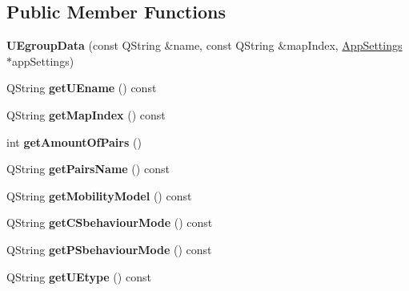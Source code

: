 \subsection*{Public Member Functions}
\begin{DoxyCompactItemize}
\item 
{\bfseries U\+Egroup\+Data} (const Q\+String \&name, const Q\+String \&map\+Index, \hyperlink{class_app_settings}{App\+Settings} $\ast$app\+Settings)\hypertarget{class_u_egroup_data_a5d54274ef8161294ce93e2779d9a3e70}{}\label{class_u_egroup_data_a5d54274ef8161294ce93e2779d9a3e70}

\item 
Q\+String {\bfseries get\+U\+Ename} () const \hypertarget{class_u_egroup_data_a6b0fd6c352634acf143cb7040cd6c524}{}\label{class_u_egroup_data_a6b0fd6c352634acf143cb7040cd6c524}

\item 
Q\+String {\bfseries get\+Map\+Index} () const \hypertarget{class_u_egroup_data_a41a12eaa70abd470ae7e13d7dc60eafa}{}\label{class_u_egroup_data_a41a12eaa70abd470ae7e13d7dc60eafa}

\item 
int {\bfseries get\+Amount\+Of\+Pairs} ()\hypertarget{class_u_egroup_data_ac4e74fda3d09e156037359834326bea1}{}\label{class_u_egroup_data_ac4e74fda3d09e156037359834326bea1}

\item 
Q\+String {\bfseries get\+Pairs\+Name} () const \hypertarget{class_u_egroup_data_a90fd3afaba2f06c4d09748947d6bfbd8}{}\label{class_u_egroup_data_a90fd3afaba2f06c4d09748947d6bfbd8}

\item 
Q\+String {\bfseries get\+Mobility\+Model} () const \hypertarget{class_u_egroup_data_a1f2349202d9ce30011c67ef9c819b573}{}\label{class_u_egroup_data_a1f2349202d9ce30011c67ef9c819b573}

\item 
Q\+String {\bfseries get\+C\+Sbehaviour\+Mode} () const \hypertarget{class_u_egroup_data_afcbfb3b20921d5c50f9f5e450eef18ef}{}\label{class_u_egroup_data_afcbfb3b20921d5c50f9f5e450eef18ef}

\item 
Q\+String {\bfseries get\+P\+Sbehaviour\+Mode} () const \hypertarget{class_u_egroup_data_a70b0175d46643d956cb767a791cb8d4a}{}\label{class_u_egroup_data_a70b0175d46643d956cb767a791cb8d4a}

\item 
Q\+String {\bfseries get\+U\+Etype} () const \hypertarget{class_u_egroup_data_a0736fde99e2c5f709e04b74144bdd0dc}{}\label{class_u_egroup_data_a0736fde99e2c5f709e04b74144bdd0dc}


\end{DoxyCompactItemize}
